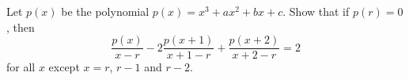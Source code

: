 Let $p(x)$ be the polynomial $p(x) = x^3 + ax^2 + bx + c$. Show that if $p(r) = 0$, then
$$ \frac{p(x)}{x-r} - 2\frac{p(x+1)}{x+1-r} + \frac{p(x+2)}{x+2-r} = 2 $$
for all $x$ except $x = r$, $r - 1$ and $r - 2$.
